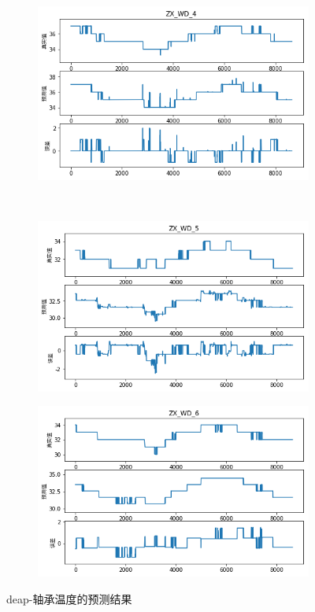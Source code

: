 \begin{figure}[H]
\begin{subfigure}[t]{0.48\textwidth}
\end{subfigure}\hfill
\begin{subfigure}[t]{0.48\textwidth}
    \centering
    \includegraphics[scale=0.45]{figures/sr/deap-zw_wd_4.png}
\end{subfigure}\\
\begin{subfigure}[t]{0.48\textwidth}
  \centering
  \includegraphics[scale=0.45]{figures/sr/deap-zw_wd_5.png}
\end{subfigure}\hfill
\begin{subfigure}[t]{0.48\textwidth}
    \centering
    \includegraphics[scale=0.45]{figures/sr/deap-zw_wd_6.png}
\end{subfigure}
\caption{deap-轴承温度的预测结果}
\label{fig:deap_zx_wd}
\end{figure}

